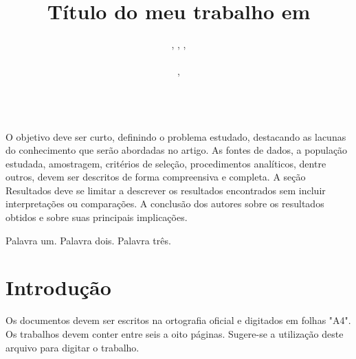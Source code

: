 \documentclass{modelo}
\newcommand{\resumotexto}  
{  
  
O objetivo deve ser curto, definindo o problema estudado, destacando as lacunas do conhecimento que serão abordadas no artigo.
As fontes de dados, a população estudada, amostragem, critérios de seleção, procedimentos analíticos, dentre outros, devem ser descritos de forma compreensiva e completa. A seção Resultados deve se limitar a descrever os resultados encontrados sem incluir interpretações ou comparações. A conclusão dos autores sobre os resultados obtidos e sobre suas principais implicações. 
}
\newcommand{\palavraschave}{Palavra um. Palavra dois. Palavra três.}
\begin{document}
 	
\title{Título do meu trabalho em \LaTeXe}
 
  	 
\author{  
 

,  
,  
,   

 \\  
 
 
,  

	  

\\       
			 
} 
  


\criartitulo  
\thispagestyle{sei}  
\pagestyle{sei}

\begin{resumo}
\resumotexto
\end{resumo}  
	
\begin{keywords} 
 \palavraschave
\end{keywords} 


 
 
 
\section{Introdução}  

Os documentos devem ser escritos na ortografia oficial e digitados em folhas "A4". Os trabalhos devem conter entre seis a oito páginas. Sugere-se a utilização deste arquivo para digitar o trabalho. 
\end{document}

